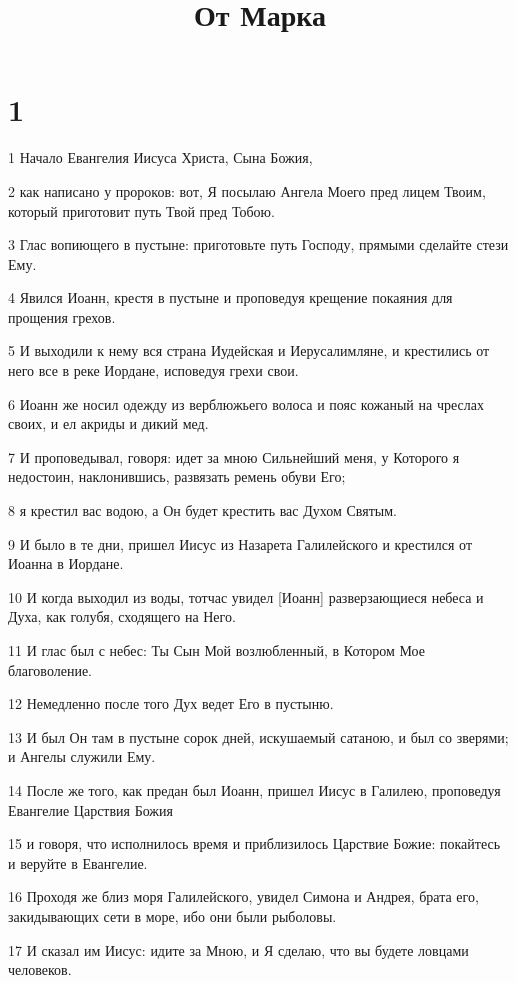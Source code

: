 

\title{От Марка}


\chapter{1}

\par 1 Начало Евангелия Иисуса Христа, Сына Божия,
\par 2 как написано у пророков: вот, Я посылаю Ангела Моего пред лицем Твоим, который приготовит путь Твой пред Тобою.
\par 3 Глас вопиющего в пустыне: приготовьте путь Господу, прямыми сделайте стези Ему.
\par 4 Явился Иоанн, крестя в пустыне и проповедуя крещение покаяния для прощения грехов.
\par 5 И выходили к нему вся страна Иудейская и Иерусалимляне, и крестились от него все в реке Иордане, исповедуя грехи свои.
\par 6 Иоанн же носил одежду из верблюжьего волоса и пояс кожаный на чреслах своих, и ел акриды и дикий мед.
\par 7 И проповедывал, говоря: идет за мною Сильнейший меня, у Которого я недостоин, наклонившись, развязать ремень обуви Его;
\par 8 я крестил вас водою, а Он будет крестить вас Духом Святым.
\par 9 И было в те дни, пришел Иисус из Назарета Галилейского и крестился от Иоанна в Иордане.
\par 10 И когда выходил из воды, тотчас увидел [Иоанн] разверзающиеся небеса и Духа, как голубя, сходящего на Него.
\par 11 И глас был с небес: Ты Сын Мой возлюбленный, в Котором Мое благоволение.
\par 12 Немедленно после того Дух ведет Его в пустыню.
\par 13 И был Он там в пустыне сорок дней, искушаемый сатаною, и был со зверями; и Ангелы служили Ему.
\par 14 После же того, как предан был Иоанн, пришел Иисус в Галилею, проповедуя Евангелие Царствия Божия
\par 15 и говоря, что исполнилось время и приблизилось Царствие Божие: покайтесь и веруйте в Евангелие.
\par 16 Проходя же близ моря Галилейского, увидел Симона и Андрея, брата его, закидывающих сети в море, ибо они были рыболовы.
\par 17 И сказал им Иисус: идите за Мною, и Я сделаю, что вы будете ловцами человеков.
